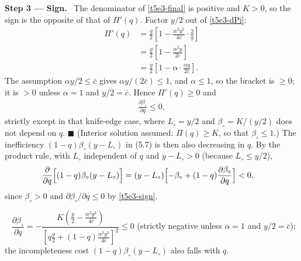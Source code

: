 \documentclass[11pt,a4paper]{article}
\newcommand{\step}[2]{\par\medskip\noindent\textbf{Step #1 --- #2.}~}
\newcommand{\answer}[1]{\par\smallskip\noindent\fbox{\textbf{Answer #1.}}~}
\begin{document}
\step{3}{Sign} The denominator of \eqref{t5e3-final} is positive and $K>0$, so the sign is the
opposite of that of $\Pi'(q)$. Factor $y/2$ out of \eqref{t5e3-dPi}:
\begin{align}
  \Pi'(q) &= \frac{y}{2}\left[1-\frac{\alpha^2y^2}{4\bar c}\cdot\frac{2}{y}\right] \nonumber\\
          &= \frac{y}{2}\left[1-\frac{\alpha^2y}{2\bar c}\right] \nonumber\\
          &= \frac{y}{2}\left[1-\alpha\cdot\frac{\alpha y}{2\bar c}\right]. \label{t5e3-factor}
\end{align}
The assumption $\alpha y/2\leq\bar c$ gives $\alpha y/(2\bar c)\leq 1$, and $\alpha\leq1$, so the
bracket is $\geq0$; it is $>0$ unless $\alpha=1$ and $y/2=\bar c$. Hence $\Pi'(q)\geq0$ and
\begin{align}
  \frac{\partial\beta_\circ}{\partial q}\leq 0, \label{t5e3-sign}
\end{align}
strictly except in that knife-edge case, where $L_\circ=y/2$ and $\beta_\circ=K/(y/2)$ does not
depend on $q$. $\blacksquare$ (Interior solution assumed: $\Pi(q)\geq K$, so that $\beta_\circ\leq1$.)
The inefficiency $(1-q)\beta_\circ(y-L_\circ)$ in (5.7) is then also decreasing in $q$. By the
product rule, with $L_\circ$ independent of $q$ and $y-L_\circ>0$ (because $L_\circ\le y/2$),
\begin{align}
  \frac{\partial}{\partial q}\Bigl[(1-q)\beta_\circ(y-L_\circ)\Bigr]
  &= (y-L_\circ)\Bigl[-\beta_\circ+(1-q)\frac{\partial\beta_\circ}{\partial q}\Bigr]<0, \label{t5e3-ineff}
\end{align}
since $\beta_\circ>0$ and $\partial\beta_\circ/\partial q\le0$ by \eqref{t5e3-sign}.

\answer{(sign)} $\dfrac{\partial\beta_\circ}{\partial q}
=-\dfrac{K\left(\frac y2-\frac{\alpha^2y^2}{4\bar c}\right)}{\left[q\frac y2+(1-q)\frac{\alpha^2y^2}{4\bar c}\right]^2}\le0$
(strictly negative unless $\alpha=1$ and $y/2=\bar c$); the incompleteness cost $(1-q)\beta_\circ(y-L_\circ)$
also falls with $q$.
\end{document}

